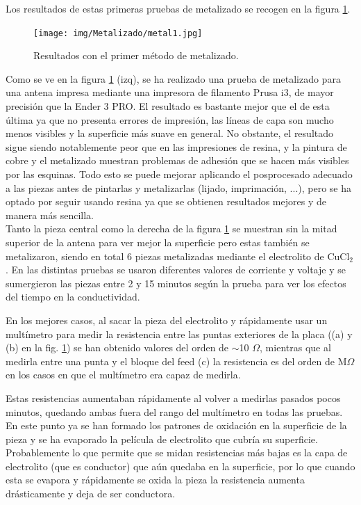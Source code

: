 \documentclass[11pt,a4paper,twoside,pdf]{article}
\numberwithin{equation}{section}
\begin{document}
Los resultados de estas primeras pruebas de metalizado se recogen en la figura \ref{fig:metalizado1}.
\begin{figure}[!h]
    \centering
    \texttt{[image: img/Metalizado/metal1.jpg]}
    \vspace{-0.5cm}
    \caption{Resultados con el primer método de metalizado.}
    \label{fig:metalizado1}
\end{figure}

Como se ve en la figura \ref{fig:metalizado1} (izq), se ha realizado una prueba de metalizado para una antena impresa mediante una impresora de filamento Prusa i3, de mayor precisión que la Ender 3 PRO. El resultado es bastante mejor que el de esta última ya que no presenta errores de impresión, las líneas de capa son mucho menos visibles y la superficie más suave en general. No obstante, el resultado sigue siendo notablemente peor que en las impresiones de resina, y la pintura de cobre y el metalizado muestran problemas de adhesión que se hacen más visibles por las esquinas. Todo esto se puede mejorar aplicando el posprocesado adecuado a las piezas antes de pintarlas y metalizarlas (lijado, imprimación, ...), pero se ha optado por seguir usando resina ya que se obtienen resultados mejores y de manera más sencilla.\\

Tanto la pieza central como la derecha de la figura \ref{fig:metalizado1} se muestran sin la mitad superior de la antena para ver mejor la superficie pero estas también se metalizaron, siendo en total 6 piezas metalizadas mediante el electrolito de CuCl$_2$. En las distintas pruebas se usaron diferentes valores de corriente y voltaje y se sumergieron las piezas entre 2 y 15 minutos según la prueba para ver los efectos del tiempo en la conductividad.

En los mejores casos, al sacar la pieza del electrolito y rápidamente usar un multímetro para medir la resistencia entre las puntas exteriores de la placa ((a) y (b) en la fig. \ref{fig:metalizado1}) se han obtenido valores del orden de $\sim$10 $\Omega$, mientras que al medirla entre una punta y el bloque del feed (c) la resistencia es del orden de M$\Omega$ en los casos en que el multímetro era capaz de medirla. 

Estas resistencias aumentaban rápidamente al volver a medirlas pasados pocos minutos, quedando ambas fuera del rango del multímetro en todas las pruebas. En este punto ya se han formado los patrones de oxidación en la superficie de la pieza y se ha evaporado la película de electrolito que cubría su superficie. Probablemente lo que permite que se midan resistencias más bajas es la capa de electrolito (que es conductor) que aún quedaba en la superficie, por lo que cuando esta se evapora y rápidamente se oxida la pieza la resistencia aumenta drásticamente y deja de ser conductora. 
\end{document}
